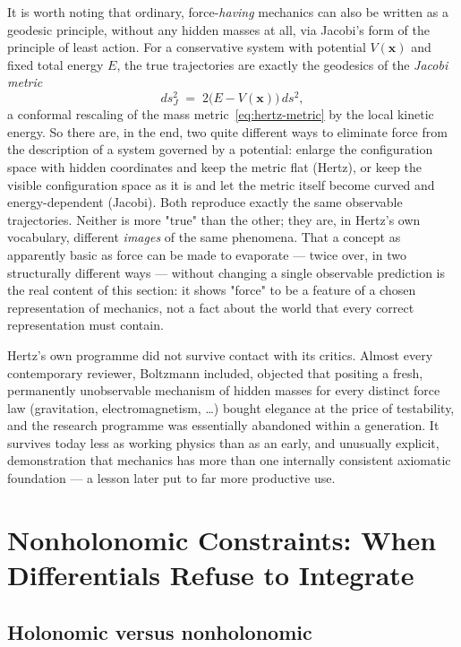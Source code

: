 It is worth noting that ordinary, force-\emph{having} mechanics can
also be written as a geodesic principle, without any hidden masses
at all, via Jacobi's form of the principle of least action. For a
conservative system with potential $V(\mathbf x)$ and fixed total
energy $E$, the true trajectories are exactly the geodesics of the
\emph{Jacobi metric}
\begin{equation}
  ds_J^2 \;=\; 2\bigl(E-V(\mathbf x)\bigr)\, ds^2 ,
  \label{eq:jacobi-metric}
\end{equation}
a conformal rescaling of the mass metric~\eqref{eq:hertz-metric} by
the local kinetic energy. So there are, in the end, two quite
different ways to eliminate force from the description of a system
governed by a potential: enlarge the configuration space with hidden
coordinates and keep the metric flat (Hertz), or keep the visible
configuration space as it is and let the metric itself become curved
and energy-dependent (Jacobi). Both reproduce exactly the same
observable trajectories. Neither is more "true" than the other; they
are, in Hertz's own vocabulary, different \emph{images} of the same
phenomena. That a concept as apparently basic as force can be made
to evaporate --- twice over, in two structurally different ways ---
without changing a single observable prediction is the real content
of this section: it shows "force" to be a feature of a chosen
representation of mechanics, not a fact about the world that every
correct representation must contain.

Hertz's own programme did not survive contact with its critics.
Almost every contemporary reviewer, Boltzmann included, objected
that positing a fresh, permanently unobservable mechanism of hidden
masses for every distinct force law (gravitation, electromagnetism,
\ldots) bought elegance at the price of testability, and the
research programme was essentially abandoned within a generation. It
survives today less as working physics than as an early, and
unusually explicit, demonstration that mechanics has more than one
internally consistent axiomatic foundation --- a lesson later put to
far more productive use.

\section{Nonholonomic Constraints: When Differentials Refuse to
  Integrate}
\label{sec:nonholonomic}

\subsection{Holonomic versus nonholonomic}

